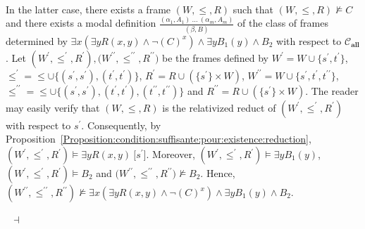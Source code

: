 \documentclass[draft]{article}
\newenvironment{proof}{{\bf Proof:}}{~$\dashv$\\}
\def\allfra{\mathbf{all}}
\begin{document}
\begin{proof}
\\
%
%
In the latter case, there exists a frame $(W,{\leq},{R})$ such that $(W,{\leq},{R}){\not\models}C$ and there exists a modal definition $\frac{(\alpha_{1},A_{1})\ \ldots\ (\alpha_{m},A_{m})}{(\beta,B)}$ of the class of frames determined by
%
%
%
%
%
%
%
\linebreak$
%
%
%
%
%
%
{\exists x}({\exists y}R(x,y){\wedge}{\neg}(C)^{x}){\wedge}{\exists y}B_{1}(y){\wedge}B_{2}$ with respect to ${\mathcal C}_{\allfra}$.
Let $(W^{\prime},{\leq^{\prime}},{R^{\prime}}),(W^{\prime\prime},
%
%
%
%
%
%
%
$\linebreak$
%
%
%
%
%
%
{\leq^{\prime\prime}},{R^{\prime\prime}})$ be the frames defined by $W^{\prime}{=}W\cup\{s^{\prime},t^{\prime}\}$, ${\leq^{\prime}}{=}{\leq}{\cup}\{(s^{\prime},s^{\prime}),(t^{\prime},t^{\prime})\}$, $R^{\prime}{=}R{\cup}
%
%
%
%
%
%
%
$\linebreak$
%
%
%
%
%
%
(\{s^{\prime}\}\times W)$, $W^{\prime\prime}{=}W\cup\{s^{\prime},t^{\prime},t^{\prime\prime}\}$, ${\leq^{\prime\prime}}{=}{\leq}{\cup}\{(s^{\prime},s^{\prime}),(t^{\prime},t^{\prime}),(t^{\prime\prime},t^{\prime\prime})\}$ and $R^{\prime\prime}{=}R{\cup}
%
%
%
%
%
%
%
$\linebreak$
%
%
%
%
%
%
(\{s^{\prime}\}\times W)$.
The reader may easily verify that $(W,{\leq},{R})$ is the relativized reduct of $(W^{\prime},{\leq^{\prime}},{R^{\prime}})$ with respect to $s^{\prime}$.
Consequently, by Proposition~\ref{Proposition:condition:suffisante:pour:existence:reduction}, $(W^{\prime},{\leq^{\prime}},{R^{\prime}}){\models}
%
%
%
%
%
%
%
$\linebreak$
%
%
%
%
%
%
{\exists y}R(x,y)\ \lbrack s^{\prime}\rbrack$.
Moreover, $(W^{\prime},{\leq^{\prime}},{R^{\prime}}){\models}{\exists y}B_{1}(y)$, $(W^{\prime},{\leq^{\prime}},{R^{\prime}}){\models}B_{2}$ and $(W^{\prime\prime},{\leq^{\prime\prime}},
%
%
%
%
%
%
%
$\linebreak$
%
%
%
%
%
%
{R^{\prime\prime}}){\not\models}B_{2}$.
Hence, $(W^{\prime\prime},{\leq^{\prime\prime}},{R^{\prime\prime}}){\not\models}{\exists x}({\exists y}R(x,y){\wedge}{\neg}(C)^{x}){\wedge}{\exists y}B_{1}(y){\wedge}B_{2}$.

\end{proof}
\end{document}

